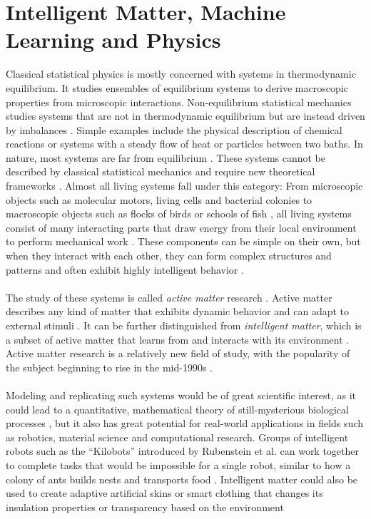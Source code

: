 \section{Intelligent Matter, Machine Learning and Physics}
\label{sec:intelligent-matter}
Classical statistical physics is mostly concerned with systems in thermodynamic equilibrium. It studies ensembles of equilibrium systems to derive macroscopic properties from microscopic interactions. Non-equilibrium statistical mechanics studies systems that are not in thermodynamic equilibrium but are instead driven by imbalances \cite{wiki_statistical_2024}. Simple examples include the physical description of chemical reactions or systems with a steady flow of heat or particles between two baths. In nature, most systems are far from equilibrium \cite{fodor_how_2016}. These systems cannot be described by classical statistical mechanics and require new theoretical frameworks \cite{fodor_how_2016}. Almost all living systems fall under this category: From microscopic objects such as molecular motors, living cells and bacterial colonies to macroscopic objects such as flocks of birds or schools of fish \cite{cichos_machine_2020,fodor_how_2016}, all living systems consist of many interacting parts that draw energy from their local environment to perform mechanical work \cite{popkin_physics_2016}. These components can be simple on their own, but when they interact with each other, they can form complex structures and patterns and often exhibit highly intelligent behavior \cite{popkin_physics_2016,kaspar_rise_2021}.
\\
\\
The study of these systems is called \textit{active matter} research \cite{kaspar_rise_2021}. Active matter describes any kind of matter that exhibits dynamic behavior and can adapt to external stimuli \cite{kaspar_rise_2021}. It can be further distinguished from \textit{intelligent matter}, which is a subset of active matter that learns from and interacts with its environment \cite{kaspar_rise_2021}. Active matter research is a relatively new field of study, with the popularity of the subject beginning to rise in the mid-1990s \cite{popkin_physics_2016}. 
\\
\\
Modeling and replicating such systems would be of great scientific interest, as it could lead to a quantitative, mathematical theory of still-mysterious biological processes \cite{popkin_physics_2016}, but it also has great potential for real-world applications in fields such as robotics, material science and computational research. Groups of intelligent robots such as the \enquote{Kilobots} introduced by Rubenstein et al. \cite{rubenstein_kilobot_2012} can work together to complete tasks that would be impossible for a single robot, similar to how a colony of ants builds nests and transports food \cite{rubenstein_kilobot_2012}. Intelligent matter could also be used to create adaptive artificial skins \cite{kaspar_rise_2021} or smart clothing that changes its insulation properties or transparency based on the environment \cite{fernandez-carames_towards_2018}
